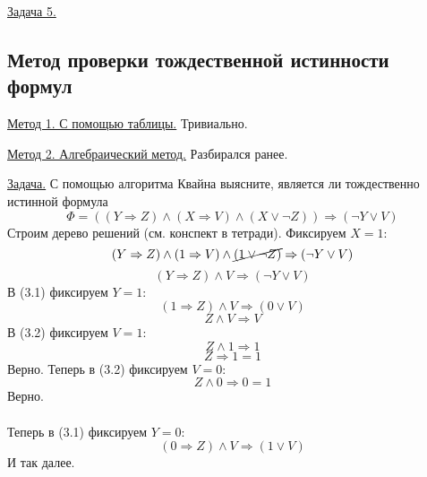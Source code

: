 \underline{Задача 5.}

\subsection{Метод проверки тождественной истинности формул}

\underline{Метод 1. С помощью таблицы.} Тривиально.

\underline{Метод 2. Алгебраический метод.} Разбирался ранее.


\underline{Задача.} С помощью алгоритма Квайна выясните, является ли тождественно истинной формула
\begin{equation*}
    \Phi = ((Y \Rightarrow Z) \land (X \Rightarrow V) \land (X \lor \neg Z)) \Rightarrow (\neg Y \lor V)
\end{equation*}
Строим дерево решений (см. конспект в тетради). Фиксируем $X = 1$:
\begin{equation*}
    (Y \Rightarrow Z) \land (1 \Rightarrow V) \land \cancel{(1 \lor \neg Z)} \Rightarrow (\neg Y \lor V)
\end{equation*}
\begin{equation}
    (Y \Rightarrow Z) \land V \Rightarrow (\neg Y \lor V)
\end{equation}
В (3.1) фиксируем $Y=1$:
\begin{equation*}
    (1 \Rightarrow Z) \land V \Rightarrow (0 \lor V)
\end{equation*}
\begin{equation}
    Z \land V \Rightarrow V
\end{equation}
В (3.2) фиксируем $V=1$:
\begin{equation*}
    Z \land 1 \Rightarrow 1
\end{equation*}
\begin{equation*}
    Z \Rightarrow 1 = 1
\end{equation*}
Верно. Теперь в (3.2) фиксируем $V=0$:
\begin{equation*}
    Z \land 0 \Rightarrow 0 = 1
\end{equation*}
Верно. \\ \\ Теперь в (3.1) фиксируем $Y=0$:
\begin{equation*}
    (0 \Rightarrow Z) \land V \Rightarrow (1 \lor V)
\end{equation*}
И так далее.